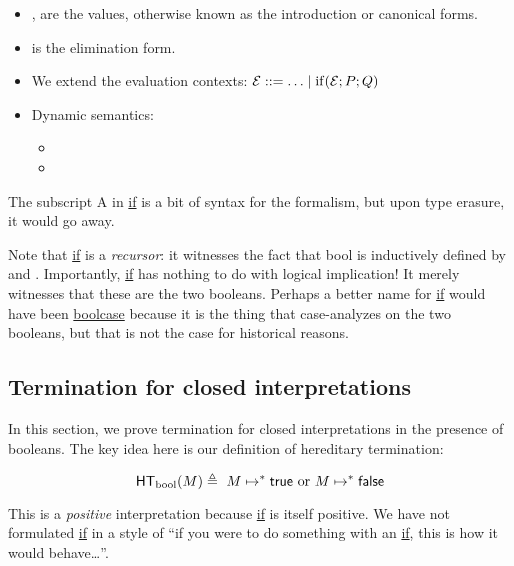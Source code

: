 \documentclass{article}
\begin{document}
\begin{itemize}
    \item \true{}, \false{} are the values, otherwise known as the introduction or canonical forms.
    \item {} is the elimination form.
    \item We extend the evaluation contexts: $\mathcal{E} ::= \ldots \mid \mathrm{if}(\mathcal{E}; P; Q)$
    \item Dynamic semantics:
    \begin{itemize}
                \item {}
                \item {}
        \end{itemize}
\end{itemize}


The subscript A in \underline{if} is a bit of syntax for the formalism, but upon type erasure, it would go away.

Note that \underline{if} is a \textit{recursor}: it witnesses the fact that bool is inductively defined by \true{} and \false{}. Importantly, \underline{if} has nothing to do with logical implication! It merely witnesses that these are the two booleans. Perhaps a better name for \underline{if} would have been \underline{boolcase} because it is the thing that case-analyzes on the two booleans, but that is not the case for historical reasons.

\subsection{Termination for closed interpretations}
In this section, we prove termination for closed interpretations in the presence of booleans. The key idea here is our definition of hereditary termination:

\[
\hterm{\booltype}{M} \triangleq \ \steps{M}{\true} \ \text{or} \ \steps{M}{\false}
\]


This is a \textit{positive} interpretation because \underline{if} is itself positive. We have not formulated \underline{if} in a style of ``if you were to do something with an \underline{if}, this is how it would behave\ldots''.
\end{document}
